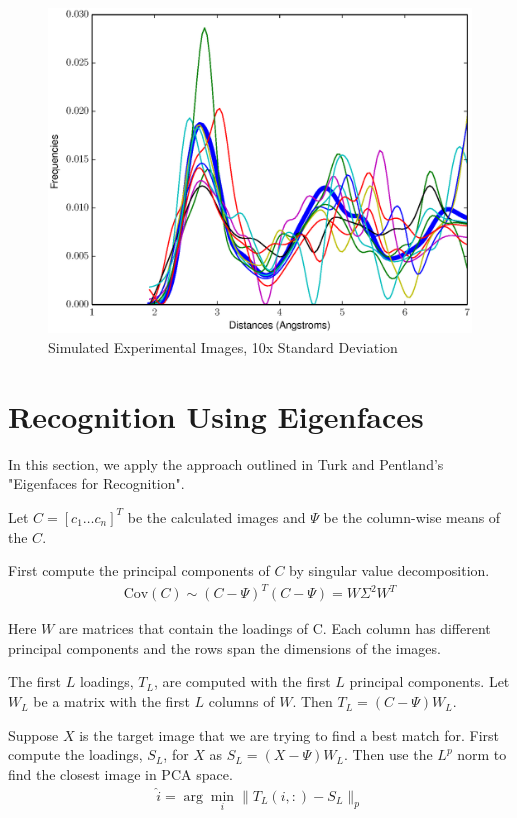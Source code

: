 \documentclass[12pt,letterpaper]{article}
\begin{document}
\begin{figure}[ht]
  \begin{center}
    \includegraphics[scale=0.8]{figs/RandomImgs10x.eps}
    \caption{Simulated Experimental Images, 10x Standard Deviation}
  \end{center}
\end{figure}
\clearpage

\section{Recognition Using Eigenfaces}
In this section, we apply the approach outlined in Turk and Pentland's
"Eigenfaces for Recognition".

Let $C = [c_1 \ldots c_n]^T$ be the calculated images and $\Psi$ be the
column-wise means of the $C$.

First compute the principal components of $C$ by singular value decomposition.
\begin{align*}
  \mbox{Cov}(C) \sim (C - \Psi)^T (C - \Psi) = W \Sigma^2 W^T
\end{align*}

Here $W$ are matrices that contain the loadings of C. Each column has different
principal components and the rows span the dimensions of the images.

The first $L$ loadings, $T_L$, are computed with the first $L$ principal
components. Let $W_L$ be a matrix with the first $L$ columns of $W$. Then 
$T_L = (C - \Psi) W_L$.

Suppose $X$ is the target image that we are trying to find a best match for.
First compute the loadings, $S_L$, for $X$ as $S_L = (X - \Psi) W_L$. Then use
the $L^p$ norm to find the closest image in PCA space.
\begin{align*}
  \hat{i} = \arg \min_i \| T_L(i,:) - S_L \|_p
\end{align*}
\end{document}
